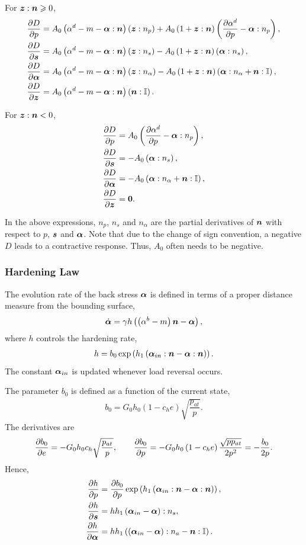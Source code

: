 For $\bm{z}:\bm{n}\geqslant0$,
\begin{align}
\dfrac{\partial{D}}{\partial{p}}&=A_0\left(\alpha^d-m-\bm{\alpha}:\bm{n}\right)\left(\bm{z}:n_p\right)+A_0\left(1+\bm{z}:\bm{n}\right)\left(\dfrac{\partial{\alpha^d}}{\partial{p}}-\bm{\alpha}:n_p\right),\\
\dfrac{\partial{D}}{\partial{\bm{s}}}&=A_0\left(\alpha^d-m-\bm{\alpha}:\bm{n}\right)\left(\bm{z}:n_s\right)-A_0\left(1+\bm{z}:\bm{n}\right)\left(\bm{\alpha}:n_s\right),\\
\dfrac{\partial{D}}{\partial{\bm{\alpha}}}&=A_0\left(\alpha^d-m-\bm{\alpha}:\bm{n}\right)\left(\bm{z}:n_\alpha\right)-A_0\left(1+\bm{z}:\bm{n}\right)\left(\bm{\alpha}:n_\alpha+\bm{n}:\mathbb{I}\right),\\
\dfrac{\partial{D}}{\partial{\bm{z}}}&=A_0\left(\alpha^d-m-\bm{\alpha}:\bm{n}\right)\left(\bm{n}:\mathbb{I}\right).
\end{align}

For $\bm{z}:\bm{n}<0$,
\begin{align}
\dfrac{\partial{D}}{\partial{p}}&=A_0\left(\dfrac{\partial{\alpha^d}}{\partial{p}}-\bm{\alpha}:n_p\right),\\
\dfrac{\partial{D}}{\partial{\bm{s}}}&=-A_0\left(\bm{\alpha}:n_s\right),\\
\dfrac{\partial{D}}{\partial{\bm{\alpha}}}&=-A_0\left(\bm{\alpha}:n_\alpha+\bm{n}:\mathbb{I}\right),\\
\dfrac{\partial{D}}{\partial{\bm{z}}}&=\bm{0}.
\end{align}

In the above expressions, $n_p$, $n_s$ and $n_\alpha$ are the partial derivatives of $\bm{n}$ with respect to $p$, $\bm{s}$ and $\bm{\alpha}$.
Note that due to the change of sign convention, a negative $D$ leads to a contractive response.
Thus, $A_0$ often needs to be negative.
\subsubsection{Hardening Law}
The evolution rate of the back stress $\bm{\alpha}$ is defined in terms of a proper distance measure from the bounding surface,
\begin{gather}
\dot{\bm{\alpha}}=\gamma{}h\left(\left(\alpha^b-m\right)\bm{n}-\bm{\alpha}\right),
\end{gather}
where $h$ controls the hardening rate,
\begin{gather}
h=b_0\exp\left(h_1\left(\bm{\alpha}_{in}:\bm{n}-\bm{\alpha}:\bm{n}\right)\right).
\end{gather}
The constant $\bm{\alpha}_{in}$ is updated whenever load reversal occurs.

The parameter $b_0$ is defined as a function of the current state,
\begin{gather}
b_0=G_0h_0\left(1-c_he\right)\sqrt{\dfrac{p_{at}}{p}}.
\end{gather}
The derivatives are
\begin{gather}
\dfrac{\partial{b_0}}{\partial{e}}=-G_0h_0c_h\sqrt{\dfrac{p_{at}}{p}},\qquad
\dfrac{\partial{b_0}}{\partial{p}}=-G_0h_0\left(1-c_he\right)\dfrac{\sqrt{pp_{at}}}{2p^2}=-\dfrac{b_0}{2p}.
\end{gather}
Hence,
\begin{align}
\dfrac{\partial{h}}{\partial{p}}&=\dfrac{\partial{b_0}}{\partial{p}}\exp\left(h_1\left(\bm{\alpha}_{in}:\bm{n}-\bm{\alpha}:\bm{n}\right)\right),\\
\dfrac{\partial{h}}{\partial{\bm{s}}}&=hh_1\left(\bm{\alpha}_{in}-\bm{\alpha}\right):n_s,\\
\dfrac{\partial{h}}{\partial{\bm{\alpha}}}&=hh_1\left(\left(\bm{\alpha}_{in}-\bm{\alpha}\right):n_a-\bm{n}:\mathbb{I}\right).
\end{align}
